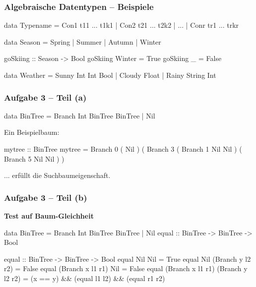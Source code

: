 \documentclass{beamer}
\begin{document}
\begin{frame}[fragile] \frametitle{Algebraische Datentypen -- Beispiele}
	
	\begin{codebox}
data Typename 
	= Con1 t11 ... t1k1
	| Con2 t21 ... t2k2
	| ...
	| Conr tr1 ... trkr
	\end{codebox}
	
	\begin{codebox}
data Season = Spring | Summer | Autumn | Winter
	\end{codebox}
	\pause
	\begin{codebox}
goSkiing :: Season -> Bool
goSkiing Winter = True
goSkiing _      = False
	\end{codebox}
	\pause
	\begin{codebox}
data Weather = Sunny Int Int Bool | Cloudy Float 
                                  | Rainy String Int 
	\end{codebox}
\end{frame}

\begin{frame}[t, fragile] \frametitle{Aufgabe 3 -- Teil (a)}
	\begin{codebox}
data BinTree = Branch Int BinTree BinTree | Nil
	\end{codebox}
	\pause
	
	Ein Beispielbaum: \\[6pt]
	\begin{codebox}
mytree :: BinTree 
mytree = Branch 0 
         ( Nil )
         ( Branch 3 
           ( Branch 1 Nil Nil )
           ( Branch 5 Nil Nil )
         )
	\end{codebox}
	... erfüllt die Suchbaumeigenschaft.
\end{frame}

\begin{frame}[t, fragile] \frametitle{Aufgabe 3 -- Teil (b)}
	\textbf{Test auf Baum-Gleichheit}
	
	\pause
	
	\begin{codebox}
data BinTree = Branch Int BinTree BinTree | Nil
equal :: BinTree -> BinTree -> Bool
	\end{codebox}
	
	\bigskip \pause
	
	\begin{codebox}
equal :: BinTree -> BinTree -> Bool
equal Nil              Nil              = True
equal Nil              (Branch y l2 r2) = False
equal (Branch x l1 r1) Nil              = False
equal (Branch x l1 r1) (Branch y l2 r2)
	= (x == y) && (equal l1 l2) && (equal r1 r2)
	\end{codebox}
\end{frame}
\end{document}
